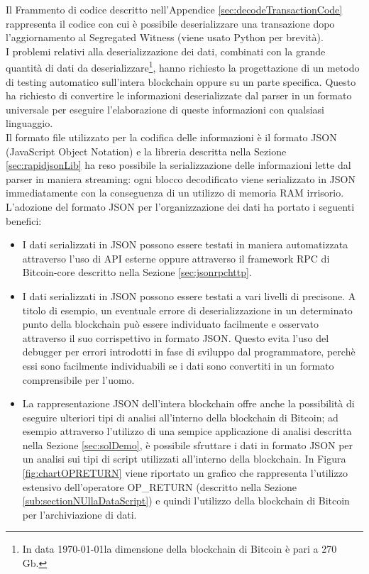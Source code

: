 Il Frammento di codice descritto nell'Appendice \ref{sec:decodeTransactionCode} rappresenta il codice con cui è possibile deserializzare una transazione dopo l'aggiornamento al Segregated Witness (viene usato Python per brevità).\\
I problemi relativi alla deserializzazione dei dati, combinati con la grande quantità di dati da deserializzare\footnote{In data \today la dimensione della blockchain di Bitcoin è pari a 270 Gb.}, hanno richiesto la progettazione di un metodo di testing automatico sull'intera blockchain oppure su un parte specifica.
Questo ha richiesto di convertire le informazioni deserializzate dal parser in un formato universale per eseguire l'elaborazione di queste informazioni con qualsiasi linguaggio.\\
Il formato file utilizzato per la codifica delle informazioni è il formato JSON (JavaScript Object Notation) e la libreria  descritta nella Sezione \ref{sec:rapidjsonLib} ha reso possibile la serializzazione delle informazioni lette dal parser in maniera streaming: ogni blocco decodificato viene serializzato in JSON immediatamente con la conseguenza di un utilizzo di memoria RAM irrisorio.\\
L'adozione del formato JSON per l'organizzazione dei dati ha portato i seguenti benefici:
\begin{itemize}
  \item I dati serializzati in JSON possono essere testati in maniera automatizzata attraverso l'uso di API esterne oppure attraverso il framework RPC di Bitcoin-core descritto nella Sezione \ref{sec:jsonrpchttp}.
  \item I dati serializzati in JSON possono essere testati a vari livelli di precisone. A titolo di esempio, un eventuale errore di deserializzazione in un determinato punto della blockchain può essere individuato facilmente e osservato attraverso il suo corrispettivo in formato JSON.
  Questo evita l'uso del debugger per errori introdotti in fase di sviluppo dal programmatore, perchè essi sono facilmente individuabili se i dati sono convertiti in un formato comprensibile per l'uomo.
  \item La rappresentazione JSON dell'intera blockchain offre anche la possibilità di eseguire ulteriori tipi di analisi all'interno della blockchain di Bitcoin; ad esempio attraverso l'utilizzo di una sempice applicazione di analisi descritta nella Sezione \ref{sec:solDemo}, è possibile sfruttare i dati in formato JSON per un analisi sui tipi di script utilizzati all'interno della blockchain.
  In Figura \ref{fig:chartOPRETURN} viene riportato un grafico che rappresenta l'utilizzo estensivo dell'operatore OP\_RETURN (descritto nella Sezione \ref{sub:sectionNUllaDataScript}) e quindi l'utilizzo della blockchain di Bitcoin per l'archiviazione di dati.
\end{itemize}

